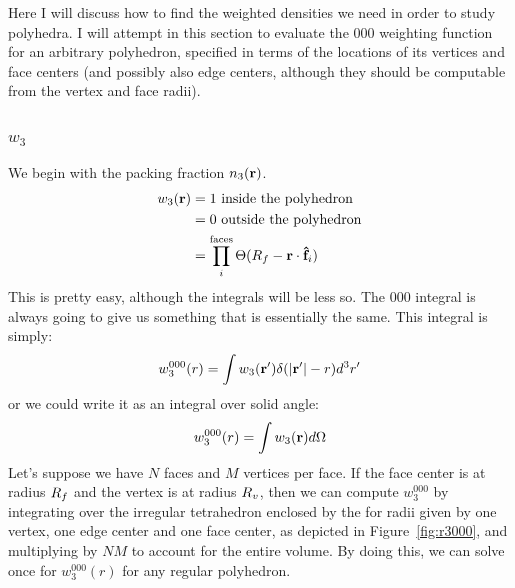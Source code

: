 \documentclass[letterpaper,twocolumn,amsmath,amssymb,pre]{revtex4-1}
\begin{document}
Here I will discuss how to find the weighted densities we need in
order to study polyhedra.  I will attempt in this section to evaluate
the $000$ weighting function for an arbitrary polyhedron, specified in
terms of the locations of its vertices and face centers (and possibly
also edge centers, although they should be computable from the vertex
and face radii).

\subsubsection{$w_3$}
We begin with the packing fraction $n_3(\mathbf{r})$.
\begin{align}
  w_3(\mathbf{r}) &= 1 \text{ inside the polyhedron}\\
  &= 0 \text{ outside the polyhedron} \\
  &= \prod_i^{\text{faces}} \Theta(R_f - \mathbf{r}\cdot\mathbf{\hat{f}}_i)
\end{align}
This is pretty easy, although the integrals will be less so.  The
$000$ integral is always going to give us something that is
essentially the same.  This integral is simply:
\begin{align}
  w_3^{000}(r) = \int w_3(\mathbf{r}') \delta(|\mathbf{r}'|-r) d^3r'\label{eq:w3000}
\end{align}
or we could write it as an integral over solid angle:
\begin{align}
  w_3^{000}(r) = \int w_3(\mathbf{r}) d\Omega
\end{align}
Let's suppose we have $N$ faces and $M$ vertices per face.  If the
face center is at radius $R_f$ and the vertex is at radius $R_v$, then
we can compute $w_3^{000}$ by integrating over the irregular
tetrahedron enclosed by the for radii given by one vertex, one edge
center and one face center, as depicted in Figure~\ref{fig:r3000}, and
multiplying by $NM$ to account for the entire volume.  By doing this,
we can solve once for $w_3^{000}(r)$ for any regular polyhedron.
\end{document}
